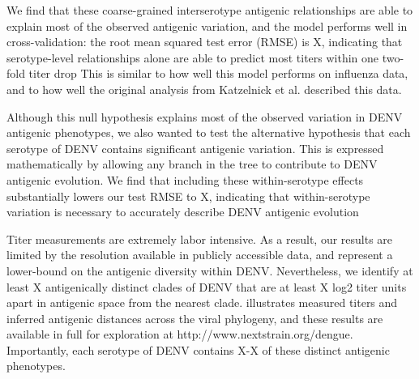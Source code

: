 \documentclass[11pt,oneside,letterpaper]{article}
\begin{document}

We find that these coarse-grained interserotype antigenic relationships are able to explain most of the observed antigenic variation, and the model performs well in cross-validation: the root mean squared test error (RMSE) is X, indicating that serotype-level relationships alone are able to predict most titers within one two-fold titer drop
This is similar to how well this model performs on influenza data, and to how well the original analysis from Katzelnick et al. described this data.

Although this null hypothesis explains most of the observed variation in DENV antigenic phenotypes, we also wanted to test the alternative hypothesis that each serotype of DENV contains significant antigenic variation.
This is expressed mathematically by allowing any branch in the tree to contribute to DENV antigenic evolution.
We find that including these within-serotype effects substantially lowers our test RMSE to X, indicating that within-serotype variation is necessary to accurately describe DENV antigenic evolution


Titer measurements are extremely labor intensive.
As a result, our results are limited by the resolution available in publicly accessible data, and represent a lower-bound on the antigenic diversity within DENV.
Nevertheless, we identify at least X antigenically distinct clades of DENV that are at least X log2 titer units apart in antigenic space from the nearest clade.
illustrates measured titers and inferred antigenic distances across the viral phylogeny, and these results are available in full for exploration at http://www.nextstrain.org/dengue.
Importantly, each serotype of DENV contains X-X of these distinct antigenic phenotypes.
\end{document}
